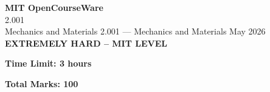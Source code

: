\documentclass[12pt,a4paper]{exam}
\begin{document}
\begin{center}
{\LARGE \textbf{MIT OpenCourseWare}}\\2.001\\Mechanics and Materials
\vspace{0.5cm}
{2.001} --- {Mechanics and Materials}
\vspace{0.3cm}
May 2026
\vspace{0.3cm}
\textbf{EXTREMELY HARD -- MIT LEVEL}
\end{center}

\begin{center}
\textbf{Time Limit: 3 hours}
\end{center}

\begin{center}
\textbf{Total Marks: 100}
\end{center}

\vspace{0.5cm}
\end{document}
